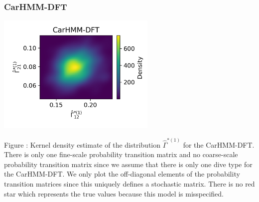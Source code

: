 \documentclass{article}
\begin{document}
        \newpage
        \subsubsection{CarHMM-DFT}
        \begin{center}
        \includegraphics[width=3in]{../Plots/hmm_FV_Gamma_density_0.png}
        \end{center}
        
        \noindent Figure : Kernel density estimate of the distribution $\hat \Gamma^{*(1)}$ for the CarHMM-DFT. There is only one fine-scale probability transition matrix and no coarse-scale probability transition matrix since we assume that there is only one dive type for the CarHMM-DFT. We only plot the off-diagonal elements of the probability transition matrices since this uniquely defines a stochastic matrix. There is no red star which represents the true values because this model is misspecified.
        \addtocounter{fignum}{1}
\end{document}
